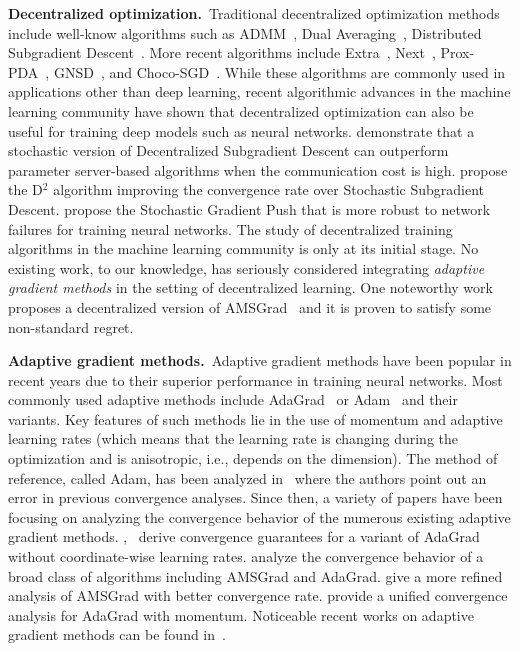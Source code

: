 \documentclass[11pt]{article}
\begin{document}
\textbf{Decentralized optimization.}\  
Traditional decentralized optimization methods include well-know algorithms such as ADMM~\citep{boyd2011distributed}, Dual Averaging~\citep{duchi2011dual}, Distributed Subgradient Descent~\citep{nedic2009distributed}. 
More recent algorithms include Extra~\citep{shi2015extra}, Next~\citep{di2016next}, Prox-PDA~\citep{hong2017prox}, GNSD~\citep{lu2019gnsd}, and Choco-SGD~\citep{koloskova2019decentralized}.  
While these algorithms are commonly used in applications other than deep learning, recent algorithmic advances in the machine learning community have shown that decentralized optimization can also be useful for training deep models such as neural networks. 
\citet{lian2017can} demonstrate that a stochastic version of Decentralized Subgradient Descent can outperform parameter server-based algorithms when the communication cost is high. 
\citet{tang2018d} propose the D$^2$ algorithm improving the convergence rate over Stochastic Subgradient Descent.
\citet{assran2019stochastic} propose the Stochastic Gradient Push that is more robust to network failures for training neural networks. 
The study of decentralized training algorithms in the machine learning community is only at its initial stage. 
No existing work, to our knowledge, has seriously considered integrating \emph{adaptive gradient methods} in the setting of decentralized learning.
One noteworthy work~\citep{nazari2019dadam} proposes a decentralized version of AMSGrad~\citep{reddi2019convergence} and it is proven to satisfy some non-standard regret.


\vspace{0.1in}
\noindent\textbf{Adaptive gradient methods.}\   
Adaptive gradient methods have been popular in recent years due to their superior performance in training neural networks. 
Most commonly used adaptive methods include AdaGrad~\citep{duchi2011adaptive} or Adam~\citep{kingma2014adam} and their variants.  
Key features of such methods lie in the use of momentum and adaptive learning rates (which means that the learning rate is changing during the optimization and is anisotropic, i.e., depends on the dimension).
The method of reference, called Adam, has been analyzed in~\cite{reddi2019convergence} where the authors point out an error in previous convergence analyses. 
Since then, a variety of papers have been focusing on analyzing the convergence behavior of the numerous existing adaptive gradient methods. 
\citet{ward2019adagrad},~\citet{li2019convergence} derive convergence guarantees for a variant of AdaGrad without coordinate-wise learning rates. 
\citet{chen2018convergence} analyze the convergence behavior of a broad class of algorithms including AMSGrad and AdaGrad. \citet{zhou2018convergence} give a more refined analysis of AMSGrad with better convergence rate.
\citet{zou2018convergence} provide a unified convergence analysis for AdaGrad with momentum.
Noticeable recent works on adaptive gradient methods can be found in~\cite{agarwal2019efficient,luo2019adaptive,zaheer2018adaptive}.  
\end{document}
